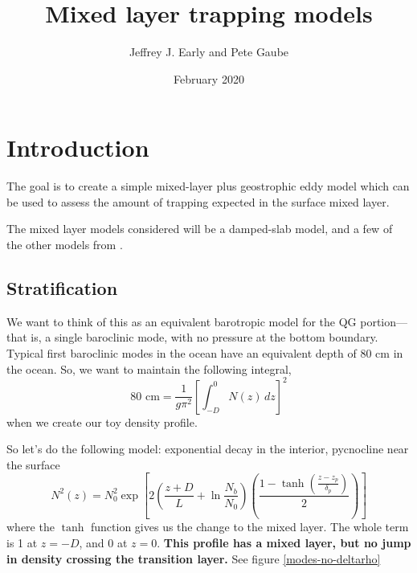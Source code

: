 \documentclass{article}
\title{Mixed layer trapping models}
\author{Jeffrey J. Early and Pete Gaube}
\date{February 2020}
\begin{document}
\maketitle

\section{Introduction}

The goal is to create a simple mixed-layer plus geostrophic eddy model which can be used to assess the amount of trapping expected in the surface mixed layer.

The mixed layer models considered will be a damped-slab model, and a few of the other models from \cite{elipot2009-os}.

%
\subsection{Stratification}
%


We want to think of this as an equivalent barotropic model for the QG portion---that is, a single baroclinic mode, with no pressure at the bottom boundary. Typical first baroclinic modes in the ocean have an equivalent depth of 80 cm in the ocean. So, we want to maintain the following integral,
\begin{equation}
    80 \textrm{ cm} = \frac{1}{g \pi^2} \left[ \int_{-D}^0 N(z) \, dz \right]^2
\end{equation}{}
when we create our toy density profile.

So let's do the following model: exponential decay in the interior, pycnocline near the surface
\begin{equation}
    N^2(z) = N_0^2 \exp \left[2 \left( \frac{z+D}{L} + \ln \frac{N_b}{N_0} \right)\left( \frac{1-\tanh\left(\frac{z-z_p}{\delta_p}\right)}{2} \right) \right]
\end{equation}{}
where the $\tanh$ function gives us the change to the mixed layer. The whole term is 1 at $z=-D$, and 0 at $z=0$. \textbf{This profile has a mixed layer, but no jump in density crossing the transition layer.} See figure \ref{modes-no-deltarho}
\end{document}
